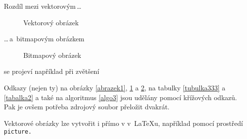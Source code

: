 \documentclass[a4paper, 11pt]{article}
\begin{document}
    Rozdíl mezi vektorovým\,\dots
    
    \begin{figure}[ht] 
        \caption{Vektorový obrázek}
        \label{abrazek2}
    \end{figure}
    \bigskip
    \noindent \dots\,a~bitmapovým obrázkem
    
    \begin{figure}[ht] 
        \caption{Bitmapový obrázek}
        \label{abrazek3}
    \end{figure}
    \noindent se projeví například při zvětšení
    
    Odkazy (nejen ty) na obrázky \ref{abrazek1}, \ref{abrazek2} a \ref{abrazek3}, na tabulky \ref{tubulka333} a \ref{tabalka2} a také na algoritmus \ref{algo3} jsou udělány pomocí křížových odkazů. Pak je ovšem potřeba zdrojový soubor přeložit dvakrát.
    
    Vektorové obrázky lze vytvořit i přímo v v~{\LaTeX}u, například pomocí prostředí\texttt{ picture.}
    
\end{document}
